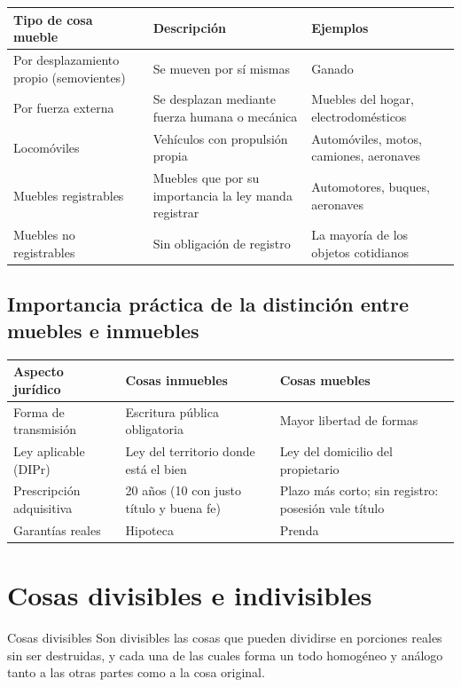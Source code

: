 \documentclass[12pt,oneside]{book}
\newenvironment{tabla}{%
    \par\medskip\begingroup\small\renewcommand{\arraystretch}{1.3}\noindent\ignorespaces
}{%
    \par\endgroup\medskip
}
\begin{document}
\begin{tabla}
\begin{tabularx}{\textwidth}{B{3.8cm}YY}
\toprule
Tipo de cosa mueble & \textbf{Descripción} & \textbf{Ejemplos} \\
\midrule
Por desplazamiento propio (semovientes) & Se mueven por sí mismas & Ganado \\
Por fuerza externa & Se desplazan mediante fuerza humana o mecánica & Muebles del hogar, electrodomésticos \\
Locomóviles & Vehículos con propulsión propia & Automóviles, motos, camiones, aeronaves \\
Muebles registrables & Muebles que por su importancia la ley manda registrar & Automotores, buques, aeronaves \\
Muebles no registrables & Sin obligación de registro & La mayoría de los objetos cotidianos \\
\bottomrule
\end{tabularx}
\end{tabla}

\subsection{Importancia práctica de la distinción entre muebles e inmuebles}

\begin{tabla}
\begin{tabularx}{\textwidth}{B{3.4cm}YY}
\toprule
Aspecto jurídico & \textbf{Cosas inmuebles} & \textbf{Cosas muebles} \\
\midrule
Forma de transmisión & Escritura pública obligatoria & Mayor libertad de formas \\
Ley aplicable (DIPr) & Ley del territorio donde está el bien & Ley del domicilio del propietario \\
Prescripción adquisitiva & 20 años (10 con justo título y buena fe) & Plazo más corto; sin registro: posesión vale título \\
Garantías reales & Hipoteca & Prenda \\
\bottomrule
\end{tabularx}
\end{tabla}

\section{Cosas divisibles e indivisibles}

\begin{definition}{Cosas divisibles}
Son divisibles las cosas que pueden dividirse en porciones reales sin ser destruidas, y cada una de las cuales forma un todo homogéneo y análogo tanto a las otras partes como a la cosa original.
\end{definition}
\end{document}
